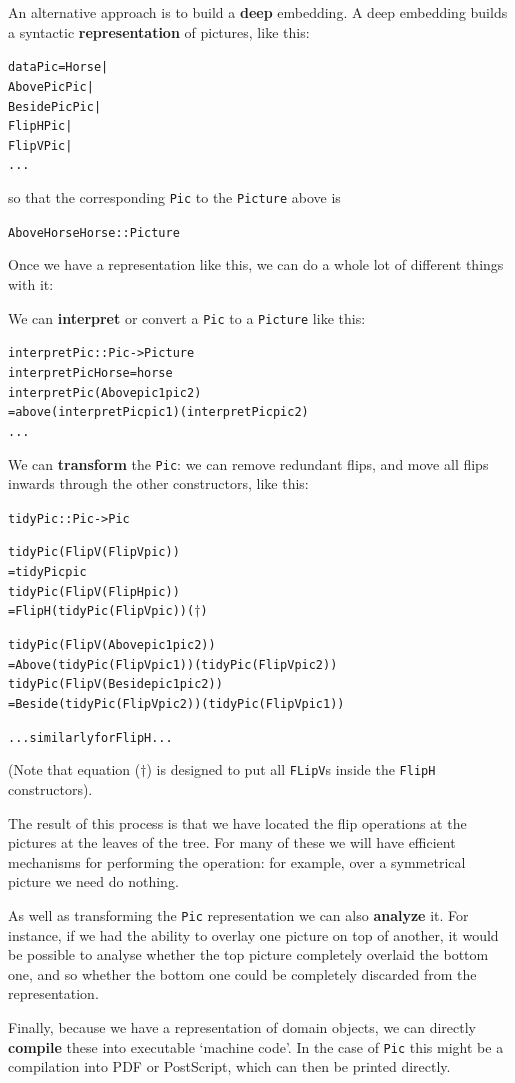 An alternative approach is to build a \textbf{deep} embedding. A deep embedding builds a syntactic \textbf{representation} of pictures, like this:
\begin{alltt}
data Pic = Horse |
           Above Pic Pic |
           Beside Pic Pic |
           FlipH Pic |
           FlipV Pic |
           ...
\end{alltt}
so that the 
corresponding \texttt{Pic} to the \texttt{Picture} above is 
\begin{alltt}
Above Horse Horse :: Picture
\end{alltt}
Once we have a representation like this, we can do a whole lot of different things with it:
\begin{titemize}
\item
We can \textbf{interpret} or convert a \texttt{Pic} to a \texttt{Picture} like this:
\begin{alltt}
interpretPic :: Pic -> Picture
interpretPic Horse = horse
interpretPic (Above pic1 pic2)
  = above (interpretPic pic1)  (interpretPic pic2)
  ...
\end{alltt}
\item 
We can \textbf{transform} the \texttt{Pic}: we can remove redundant flips, and move all flips inwards through the other constructors, like this:
\begin{alltt}
tidyPic :: Pic -> Pic

tidyPic (FlipV (FlipV pic)) 
  = tidyPic pic
tidyPic (FlipV (FlipH pic)) 
  = FlipH (tidyPic (FlipV pic)) \hfill (\ensuremath{\dagger})

tidyPic (FlipV (Above pic1 pic2))
  = Above (tidyPic (FlipV pic1)) (tidyPic (FlipV pic2)) 
tidyPic (FlipV (Beside pic1 pic2))
  = Beside (tidyPic (FlipV pic2)) (tidyPic (FlipV pic1)) 
  
  ... similarly for FlipH ...
\end{alltt}
(Note that equation (\ensuremath{\dagger}) is designed to put all \texttt{FLipV}s inside the \texttt{FlipH} constructors). 

The result of this process is that we have located the flip operations at the pictures at the leaves of the tree. For many of these we will have efficient mechanisms for performing the operation: for example, over a symmetrical picture we need do nothing.

\item
As well as transforming the \texttt{Pic} representation we can also \textbf{analyze} it.  For instance, if we had the ability to overlay one picture on top of another, it would be possible to analyse whether the top picture completely overlaid the bottom one, and so whether the bottom one could be completely discarded from the representation.

\item
Finally, because we have a representation of domain objects, we can directly \textbf{compile} these into executable `machine code'. In the case of \texttt{Pic} this might be a compilation into PDF or PostScript, which can then be printed directly.
\end{titemize}


